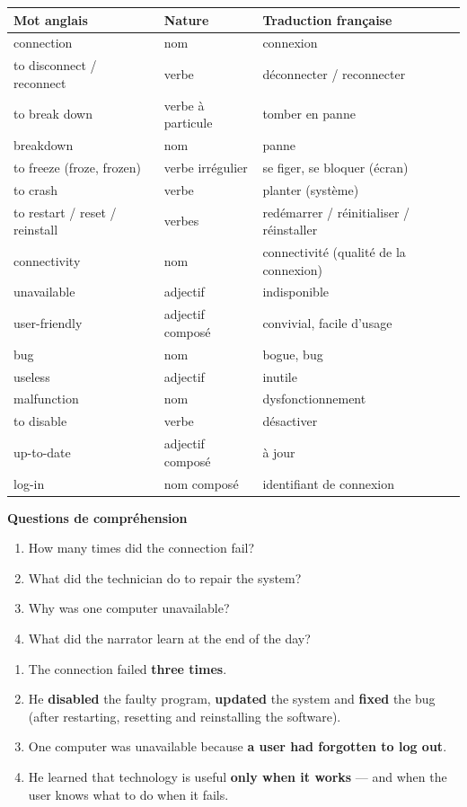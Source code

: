 \documentclass[11pt]{article}
\begin{document}
\begin{center}
\begin{tabularx}{\linewidth}{|l|l|X|}
\hline
\rowcolor{popblueL} Mot anglais & Nature & Traduction française \\
\hline
connection & nom & connexion \\
\hline
to disconnect / reconnect & verbe & déconnecter / reconnecter \\
\hline
to break down & verbe à particule & tomber en panne \\
\hline
breakdown & nom & panne \\
\hline
to freeze (froze, frozen) & verbe irrégulier & se figer, se bloquer (écran) \\
\hline
to crash & verbe & planter (système) \\
\hline
to restart / reset / reinstall & verbes & redémarrer / réinitialiser / réinstaller \\
\hline
connectivity & nom & connectivité (qualité de la connexion) \\
\hline
unavailable & adjectif & indisponible \\
\hline
user-friendly & adjectif composé & convivial, facile d'usage \\
\hline
bug & nom & bogue, bug \\
\hline
useless & adjectif & inutile \\
\hline
malfunction & nom & dysfonctionnement \\
\hline
to disable & verbe & désactiver \\
\hline
up-to-date & adjectif composé & à jour \\
\hline
log-in & nom composé & identifiant de connexion \\
\hline
\end{tabularx}
\end{center}

\textbf{Questions de compréhension}

\begin{enumerate}
\item How many times did the connection fail?
\item What did the technician do to repair the system?
\item Why was one computer unavailable?
\item What did the narrator learn at the end of the day?
\end{enumerate}

\begin{corrige}
\begin{enumerate}
\item The connection failed \textbf{three times}.
\item He \textbf{disabled} the faulty program, \textbf{updated} the system and \textbf{fixed} the bug (after restarting, resetting and reinstalling the software).
\item One computer was unavailable because \textbf{a user had forgotten to log out}.
\item He learned that technology is useful \textbf{only when it works} — and when the user knows what to do when it fails.
\end{enumerate}
\end{corrige}
\end{document}
